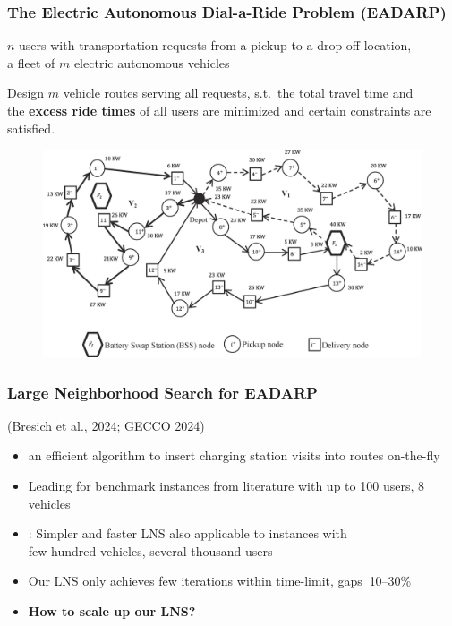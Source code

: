\documentclass[aspectratio=1610]{beamer}
\newcommand{\important}[1]{{\color{green!60!black}#1}}
\begin{document}
\begin{frame}
	\frametitle{The Electric Autonomous Dial-a-Ride Problem (EADARP)}

\citep{Bongiovanni:2019}

\bigskip
{} $n$ users with transportation requests from a pickup to a drop-off location,\\ a fleet of $m$ \important{electric autonomous} vehicles 

\medskip
{} Design $m$ vehicle routes serving all requests, s.t.\ the \important{total travel time and\\ the \textbf{excess ride times}} of all users are minimized and certain constraints are satisfied.
  
\begin{figure}
	\centering
	\includegraphics[scale=0.70]{graphics/darp-bss-example.jpg}
\end{figure}
	
\end{frame}

\begin{frame}
	\frametitle{Large Neighborhood Search for EADARP}

	(Bresich et al., 2024; GECCO 2024)

	\bigskip
	\begin{itemize}
		\itemsep3ex
		\item {} an efficient algorithm to insert charging station visits into routes on-the-fly
		\item \important{Leading} for benchmark instances from literature with up to \important{100 users, 8 vehicles}
	\end{itemize}

	\bigskip

	\bigskip
	\begin{itemize}
		\itemsep3ex
		\item<2> \citet{Limmer:2023}: Simpler and faster LNS also applicable to instances with\\
		\important{few hundred vehicles, several thousand users}
		\item<2> Our LNS only achieves \alert{few iterations within time-limit, gaps $~$10--30\%} 
		\item<2> \important{\bf How to scale up our LNS?}
	\end{itemize}

\end{frame}
\end{document}
